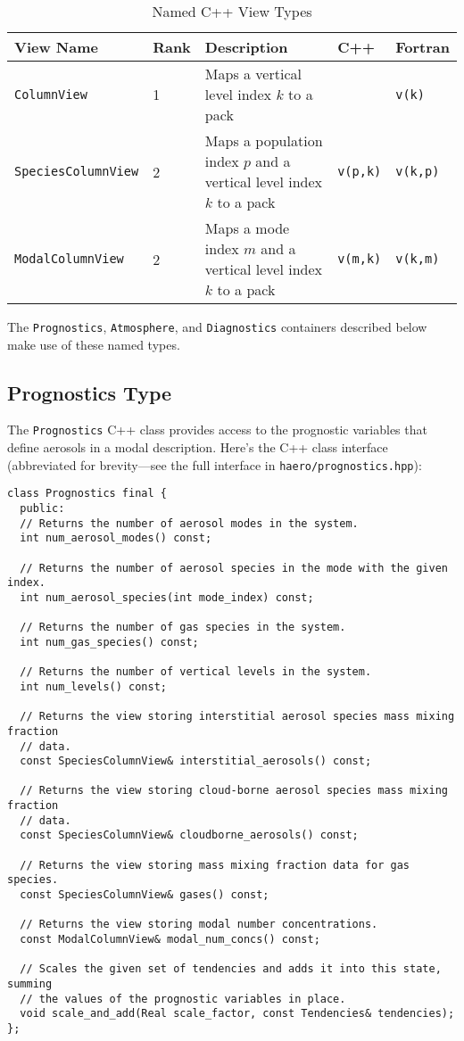 \begin{table}[htbp]
\centering
\caption{Named C++ View Types}
\label{tab:viewtypes}
\begin{tabular}{|l|l|p{6cm}|l|l|}
  \toprule
  View Name & Rank & Description & C++ & Fortran \\
  \midrule
  \texttt{ColumnView} & 1 & Maps a vertical level index $k$ to a pack & \texttt{v(k)  & \texttt{v(k)} \\
  \texttt{SpeciesColumnView} & 2 & Maps a population index $p$ and a vertical level index $k$ to a pack & \texttt{v(p,k)}  & \texttt{v(k,p)} \\
  \texttt{ModalColumnView} & 2 & Maps a mode index $m$ and a vertical level index $k$ to a pack & \texttt{v(m,k)}  & \texttt{v(k,m)} \\
  \bottomrule
\end{tabular}
\end{table}

The \texttt{Prognostics}, \texttt{Atmosphere}, and \texttt{Diagnostics} containers
described below make use of these named types.

\subsection{Prognostics Type}

The \texttt{Prognostics} C++ class provides access to the prognostic variables
that define aerosols in a modal description. Here's the C++ class interface
(abbreviated for brevity---see the full interface in \texttt{haero/prognostics.hpp}):

\begin{lstlisting}
class Prognostics final {
  public:
  // Returns the number of aerosol modes in the system.
  int num_aerosol_modes() const;

  // Returns the number of aerosol species in the mode with the given index.
  int num_aerosol_species(int mode_index) const;

  // Returns the number of gas species in the system.
  int num_gas_species() const;

  // Returns the number of vertical levels in the system.
  int num_levels() const;

  // Returns the view storing interstitial aerosol species mass mixing fraction
  // data.
  const SpeciesColumnView& interstitial_aerosols() const;

  // Returns the view storing cloud-borne aerosol species mass mixing fraction
  // data.
  const SpeciesColumnView& cloudborne_aerosols() const;

  // Returns the view storing mass mixing fraction data for gas species.
  const SpeciesColumnView& gases() const;

  // Returns the view storing modal number concentrations.
  const ModalColumnView& modal_num_concs() const;

  // Scales the given set of tendencies and adds it into this state, summing
  // the values of the prognostic variables in place.
  void scale_and_add(Real scale_factor, const Tendencies& tendencies);
};
\end{lstlisting}

